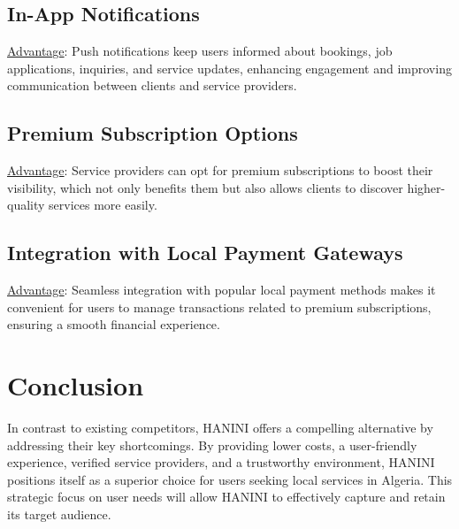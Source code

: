 \documentclass[12pt,a4paper]{report}
\begin{document}
\section{In-App Notifications}
\underline {Advantage}:  Push notifications keep users informed about bookings, job applications, inquiries, and service updates, enhancing engagement and improving communication between clients and service providers.

\section{Premium Subscription Options}
\underline {Advantage}:  Service providers can opt for premium subscriptions to boost their visibility, which not only benefits them but also allows clients to discover higher-quality services more easily.

\section{Integration with Local Payment Gateways}
\underline {Advantage}:  Seamless integration with popular local payment methods makes it convenient for users to manage transactions related to premium subscriptions, ensuring a smooth financial experience.
\newpage
\chapter{Conclusion}
In contrast to existing competitors, HANINI offers a compelling alternative by addressing their key shortcomings. By providing lower costs, a user-friendly experience, verified service providers, and a trustworthy environment, HANINI positions itself as a superior choice for users seeking local services in Algeria. This strategic focus on user needs will allow HANINI to effectively capture and retain its target audience.
\end{document}
